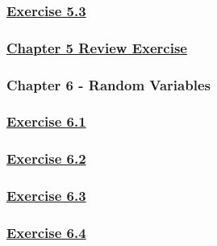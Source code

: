 \documentclass[
  11pt,
]{book}
\begin{document}
\subsubsection*{\texorpdfstring{\hyperref[ex53q]{Exercise 5.3}}{Exercise 5.3}}\label{exercise-5.3-1}

\subsubsection*{\texorpdfstring{\hyperref[re5q]{Chapter 5 Review Exercise}}{Chapter 5 Review Exercise}}\label{chapter-5-review-exercise}

\subsubsection*{Chapter 6 - Random Variables}\label{chapter-6---random-variables}

\subsubsection*{\texorpdfstring{\hyperref[ex61q]{Exercise 6.1}}{Exercise 6.1}}\label{exercise-6.1-1}

\subsubsection*{\texorpdfstring{\hyperref[ex62q]{Exercise 6.2}}{Exercise 6.2}}\label{exercise-6.2-1}

\subsubsection*{\texorpdfstring{\hyperref[ex63q]{Exercise 6.3}}{Exercise 6.3}}\label{exercise-6.3-1}

\subsubsection*{\texorpdfstring{\hyperref[ex64q]{Exercise 6.4}}{Exercise 6.4}}\label{exercise-6.4-1}
\end{document}
